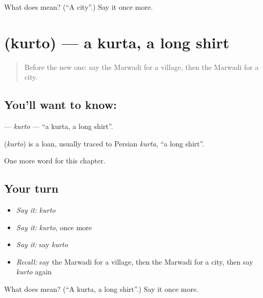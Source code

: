 \begin{tcolorbox}[breakable,colback=teal!4,colframe=teal!35!black,title={Before you move on}]
What does  mean? (\textquotedblleft{}A city\textquotedblright{}.) Say it once more.
\end{tcolorbox}
\section[\texorpdfstring{\mw{कुरतो} (kurto)}{कुरतो (kurto)}]{ (kurto) — a kurta, a long shirt}

\label{lesson:MW-C84-kurto}



\begin{quote}
Before the new one: say the Marwadi for a village, then the Marwadi for a city.
\end{quote}

\subsection*{You'll want to know: }
\textbf{} — \emph{kurto} — \textquotedblleft{}a kurta, a long shirt\textquotedblright{}.

\begin{cousinweb}
\textbf{} (\emph{kurto}) is a loan, usually traced to Persian \emph{kurta}, \textquotedblleft{}a long shirt\textquotedblright{}.
\end{cousinweb}

\begin{grammarlens}[title={What you've built}]
One more word for this chapter.
\end{grammarlens}

\subsection*{Your turn}
\begin{itemize}
\raggedright
  \item \emph{Say it:} \emph{kurto}
  \item \emph{Say it:} \emph{kurto}, once more
  \item \emph{Say it:} say \emph{kurto}
  \item \emph{Recall:} say the Marwadi for a village, then the Marwadi for a city, then say \emph{kurto} again
\end{itemize}

\begin{tcolorbox}[breakable,colback=teal!4,colframe=teal!35!black,title={Before you move on}]
What does  mean? (\textquotedblleft{}A kurta, a long shirt\textquotedblright{}.) Say it once more.
\end{tcolorbox}

